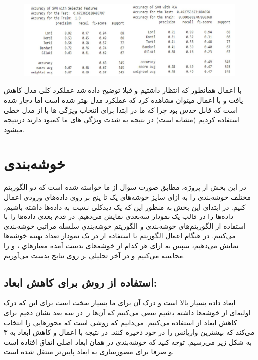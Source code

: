 \documentclass[10pt,onecolumn,a4paper]{article}
\begin{document}
\begin{figure}[h!]
        \centering
        \includegraphics[scale=0.35]{m.JPG}
        \caption{  }  
    \end{figure}
با اعمال   همانطور که انتظار داشتیم و قبلا توضیح داده شد عملکرد کلی مدل کاهش یافت و با اعمال   میتوان مشاهده کرد که عملکرد مدل بهتر شده است اما دچار  شده است که قابل حدس بود چرا که  ما در ابتدا برای انتخاب ویژگی ها  با  از مدل خطی استفاده کردیم (مشابه   است) در نتیجه به شدت ویژگی های ما کمبود  دارند درنتیجه   میشود.
\\
\pagebreak
\section{خوشه‌بندی}
\vskip1cm
در این بخش از پروژه، مطابق صورت سوال از ما خواسته شده است که دو الگوریتم مختلف خوشه‌بندی را به ازای سایز خوشه‌های یک تا پنج بر روی داده‌های ورودی اعمال كنيم. در ابتدا‌ی این بخش به منظور این که یک دیدکلی نسبت به داده‌ها داشته باشیم، داده‌ها را در قالب یک نمودار سه‌بعدی نمايش می‌دهیم.  در قدم بعدی داده‌ها را با استفاده از الگوریتم‌های خوشه‌بندی  و الگوريتم خوشه‌بندي سلسله مراتبي خوشه‌بندی می‌کنیم. در هنگام اعمال الگوريتم  با استفاده از در یک نمودار تعداد بهینه خوشه‌ها  نمايش می‌دهيم، سپس به ازای هر کدام از خوشه‌های بدست آمده معيارهاي  ،‌ و   را محاسبه می‌کنیم و در آخر تحلیلی بر روی نتایج بدست می‌آوریم.
\\
\subsection{استفاده از روش  برای کاهش ابعاد:}

ابعاد داده بسیار بالا است و درک آن برای ما بسیار سخت است برای این که درک اولیه‌ای از خوشه‌ها داشته باشیم سعی می‌کنیم که آن‌ها را در سه بعد نشان دهیم برای کاهش ابعاد از  استفاده می‌کنیم. می‌دانیم که   روشی است که محورهایی را انتخاب می‌کند که بیشترین واریانس را در خود ذخیره کنند. در نتیجه با اعمال  و کاهش ابعاد به ۳ به شکل زیر می‌رسیم. توجه کنید که خوشه‌بندی در همان ابعاد اصلی اتفاق افتاده است و صرفا برای مصورسازی به ابعاد پایین‌تر منتقل شده است.
\\
\end{document}
